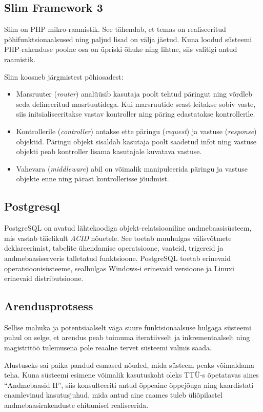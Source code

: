\documentclass[a4paper,12pt]{article} %
\begin{document}
\subsection{Slim Framework 3}
Slim \cite{SlimFW} on PHP mikro-raamistik. See tähendab, et temas on realiseeritud põhifunktsionaalsused ning paljud lisad on välja jäetud. Kuna loodud süsteemi PHP-rakenduse poolne osa on üpriski õhuke ning lihtne, siis valitigi antud raamistik.\par
Slim koosneb järgmistest põhiosadest:
\begin{itemize}
\item Marsruuter (\textit{router}) analüüsib kasutaja poolt tehtud päringut ning võrdleb seda defineeritud masrtuutidega. Kui marsruutide seast leitakse sobiv vaste, siis initsialiseeritakse vastav kontroller ning päring edastatakse kontrollerile.
\item Kontrollerile (\textit{controller}) antakse ette päringu (\textit{request}) ja vastuse (\textit{response}) objektid. Päringu objekt sisaldab kasutaja poolt saadetud infot ning vastuse objekti peab kontroller lisama kasutajale kuvatava vastuse.
\item Vahevara (\textit{middleware}) abil on võimalik manipuleerida päringu ja vastuse objekte enne ning pärast kontrollerisse jõudmist.
\end{itemize}

\subsection{Postgresql}
PostgreSQL on avatud lähtekoodiga objekt-relatsiooniline andmebaasisüsteem, mis vastab täielikult \textit{ACID} nõuetele. See toetab muuhulgas välisvõtmete deklareerimist, tabelite ühendamise operatsioone, vaateid, trigereid ja andmebaasiserveris talletatud funktsioone. PostgreSQL toetab erinevaid operatsioonisüsteeme, sealhulgas Windows-i erinevaid versioone ja Linuxi erinevaid distributsioone.
\cite{PostgreSQL_About}
\subsection{Arendusprotsess}
Sellise mahuka ja potentsiaalselt väga suure funktsionaalsuse hulgaga süsteemi puhul on selge, et arendus peab toimuma iteratiivselt ja inkrementaalselt ning magistritöö tulemusena pole reaalne tervet süsteemi valmis saada. \par

Alustuseks sai paika pandud esmased nõuded, mida süsteem peaks võimaldama teha. Kuna süsteemi esimene võimalik kasutuskoht oleks TTÜ-s õpetatavas aines ``Andmebaasid II'', siis konsulteeriti antud õppeaine õppejõuga ning kaardistati enamlevinud kasutusjuhud, mida antud aine raames tuleb üliõpilastel andmebaasirakenduste ehitamisel realiseerida.
\end{document}
